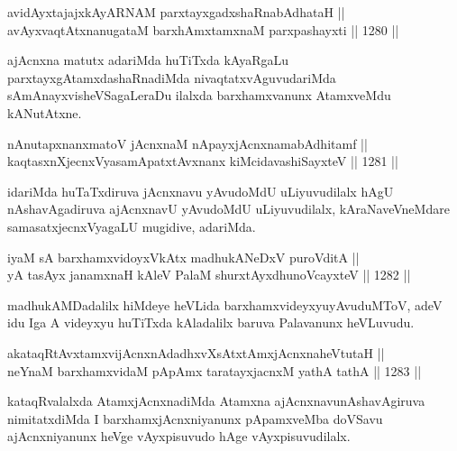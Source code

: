 \begin{shl}
avidAyxtajajxkAyARNAM parxtayxgadxshaRnabAdhataH || \\
avAyxvaqtAtxnanugataM barxhAmxtamxnaM parxpashayxti \hfill || 1280 ||  
\end{shl}

\begin{artha}
ajAcnxna matutx adariMda huTiTxda kAyaRgaLu parxtayxgAtamxdashaRnadiMda nivaqtatxvAguvudariMda sAmAnayxvisheVSagaLeraDu ilalxda barxhamxvanunx AtamxveMdu kANutAtxne.
\end{artha}

\begin{shl}
nAnutapxnanxmatoV jAcnxnaM nApayxjAcnxnamabAdhitamf ||  \\
kaqtasxnXjecnxVyasamApatxtAvxnanx kiMcidavashiSayxteV \hfill || 1281 ||  
\end{shl}

\begin{artha}
idariMda huTaTxdiruva jAcnxnavu yAvudoMdU uLiyuvudilalx hAgU nAshavAgadiruva ajAcnxnavU yAvudoMdU uLiyuvudilalx, kAraNaveVneMdare samasatxjecnxVyagaLU mugidive, adariMda.
\end{artha}

\begin{shl}
iyaM sA barxhamxvidoyxVkAtx madhukANeDxV puroVditA ||  \\
yA tasAyx janamxnaH kAleV PalaM shurxtAyx\s dhunoVcayxteV || 1282 ||  
\end{shl}

\begin{artha}
madhukAMDadalilx hiMdeye heVLida barxhamxvideyxyu\break yAvuduMToV, adeV idu Iga A videyxyu huTiTxda kAladalilx baruva Palavanunx heVLuvudu.
\end{artha}


\begin{shl}
akataqRtAvxtamxvijAcnxnAdadhxvXsAtxtAmxjAcnxnaheVtutaH || \\
neYnaM barxhamxvidaM pApAmx taratayxjacnxM yathA tathA \hfill || 1283 ||  
\end{shl}

\begin{artha}
kataqRvalalxda AtamxjAcnxnadiMda Atamxna ajAcnxnavunAshavAgiruva nimitatxdiMda I barxhamxjAcnxniyanunx pApamxveMba doVSavu ajAcnxniyanunx heVge vAyxpisuvudo hAge vAyxpisuvudilalx.
\end{artha}


